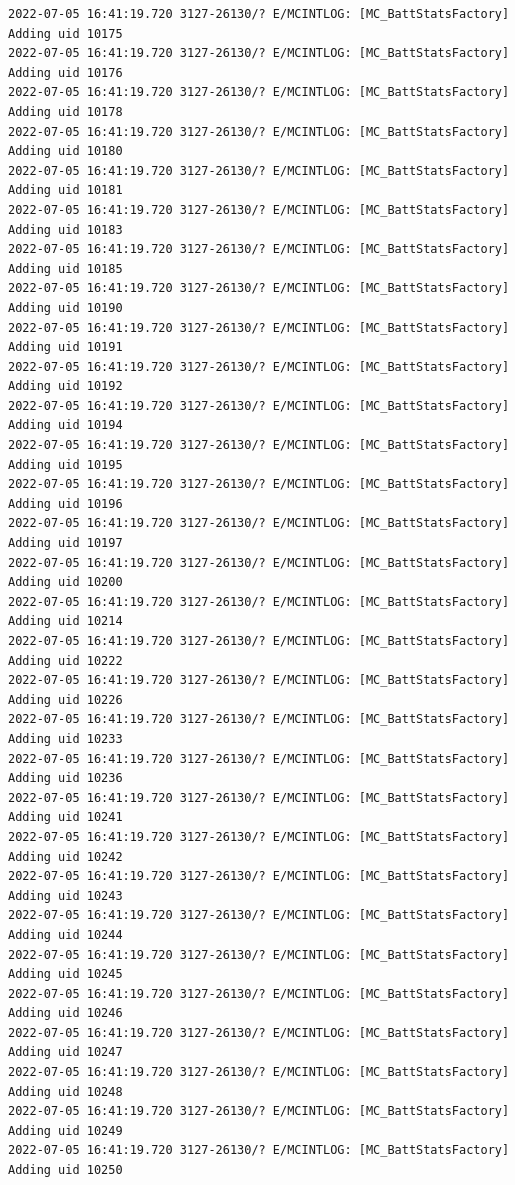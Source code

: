\documentclass[a4paper,12pt]{book}
\begin{document}
\begin{lstlisting}
2022-07-05 16:41:19.720 3127-26130/? E/MCINTLOG: [MC_BattStatsFactory] Adding uid 10175
2022-07-05 16:41:19.720 3127-26130/? E/MCINTLOG: [MC_BattStatsFactory] Adding uid 10176
2022-07-05 16:41:19.720 3127-26130/? E/MCINTLOG: [MC_BattStatsFactory] Adding uid 10178
2022-07-05 16:41:19.720 3127-26130/? E/MCINTLOG: [MC_BattStatsFactory] Adding uid 10180
2022-07-05 16:41:19.720 3127-26130/? E/MCINTLOG: [MC_BattStatsFactory] Adding uid 10181
2022-07-05 16:41:19.720 3127-26130/? E/MCINTLOG: [MC_BattStatsFactory] Adding uid 10183
2022-07-05 16:41:19.720 3127-26130/? E/MCINTLOG: [MC_BattStatsFactory] Adding uid 10185
2022-07-05 16:41:19.720 3127-26130/? E/MCINTLOG: [MC_BattStatsFactory] Adding uid 10190
2022-07-05 16:41:19.720 3127-26130/? E/MCINTLOG: [MC_BattStatsFactory] Adding uid 10191
2022-07-05 16:41:19.720 3127-26130/? E/MCINTLOG: [MC_BattStatsFactory] Adding uid 10192
2022-07-05 16:41:19.720 3127-26130/? E/MCINTLOG: [MC_BattStatsFactory] Adding uid 10194
2022-07-05 16:41:19.720 3127-26130/? E/MCINTLOG: [MC_BattStatsFactory] Adding uid 10195
2022-07-05 16:41:19.720 3127-26130/? E/MCINTLOG: [MC_BattStatsFactory] Adding uid 10196
2022-07-05 16:41:19.720 3127-26130/? E/MCINTLOG: [MC_BattStatsFactory] Adding uid 10197
2022-07-05 16:41:19.720 3127-26130/? E/MCINTLOG: [MC_BattStatsFactory] Adding uid 10200
2022-07-05 16:41:19.720 3127-26130/? E/MCINTLOG: [MC_BattStatsFactory] Adding uid 10214
2022-07-05 16:41:19.720 3127-26130/? E/MCINTLOG: [MC_BattStatsFactory] Adding uid 10222
2022-07-05 16:41:19.720 3127-26130/? E/MCINTLOG: [MC_BattStatsFactory] Adding uid 10226
2022-07-05 16:41:19.720 3127-26130/? E/MCINTLOG: [MC_BattStatsFactory] Adding uid 10233
2022-07-05 16:41:19.720 3127-26130/? E/MCINTLOG: [MC_BattStatsFactory] Adding uid 10236
2022-07-05 16:41:19.720 3127-26130/? E/MCINTLOG: [MC_BattStatsFactory] Adding uid 10241
2022-07-05 16:41:19.720 3127-26130/? E/MCINTLOG: [MC_BattStatsFactory] Adding uid 10242
2022-07-05 16:41:19.720 3127-26130/? E/MCINTLOG: [MC_BattStatsFactory] Adding uid 10243
2022-07-05 16:41:19.720 3127-26130/? E/MCINTLOG: [MC_BattStatsFactory] Adding uid 10244
2022-07-05 16:41:19.720 3127-26130/? E/MCINTLOG: [MC_BattStatsFactory] Adding uid 10245
2022-07-05 16:41:19.720 3127-26130/? E/MCINTLOG: [MC_BattStatsFactory] Adding uid 10246
2022-07-05 16:41:19.720 3127-26130/? E/MCINTLOG: [MC_BattStatsFactory] Adding uid 10247
2022-07-05 16:41:19.720 3127-26130/? E/MCINTLOG: [MC_BattStatsFactory] Adding uid 10248
2022-07-05 16:41:19.720 3127-26130/? E/MCINTLOG: [MC_BattStatsFactory] Adding uid 10249
2022-07-05 16:41:19.720 3127-26130/? E/MCINTLOG: [MC_BattStatsFactory] Adding uid 10250

\end{lstlisting}
\end{document}

